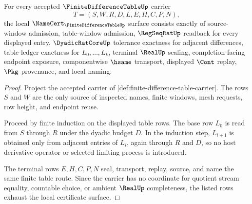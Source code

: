\begin{theorem}
\label{thm:finite-difference-table-namecert-obligations}
For every accepted $\FiniteDifferenceTableUp$ carrier
$$
T=(S,W,R,D,L,E,H,C,P,N),
$$
the local $\NameCert_{\FiniteDifferenceTableUp}$ surface consists exactly of source-window admission, table-window admission, $\RegSeqRatUp$ readback for every displayed entry, $\DyadicRatCoreUp$ tolerance exactness for adjacent differences, table-ledger exactness for $L_0,\ldots,L_k$, terminal $\RealUp$ sealing, completion-facing endpoint exposure, componentwise $\hsame$ transport, displayed $\Cont$ replay, $\Pkg$ provenance, and local naming.
\end{theorem}
\begin{proof}
Project the accepted carrier of \autoref{def:finite-difference-table-carrier}. The rows $S$ and $W$ are the only source of inspected names, finite windows, mesh requests, row height, and endpoint reuse.

Proceed by finite induction on the displayed table rows. The base row $L_0$ is read from $S$ through $R$ under the dyadic budget $D$. In the induction step, $L_{i+1}$ is obtained only from adjacent entries of $L_i$, again through $R$ and $D$, so no host derivative operator or selected limiting process is introduced.

The terminal rows $E,H,C,P,N$ seal, transport, replay, source, and name the same finite table route. Since the carrier has no coordinate for quotient stream equality, countable choice, or ambient $\RealUp$ completeness, the listed rows exhaust the local certificate surface.
\end{proof}

